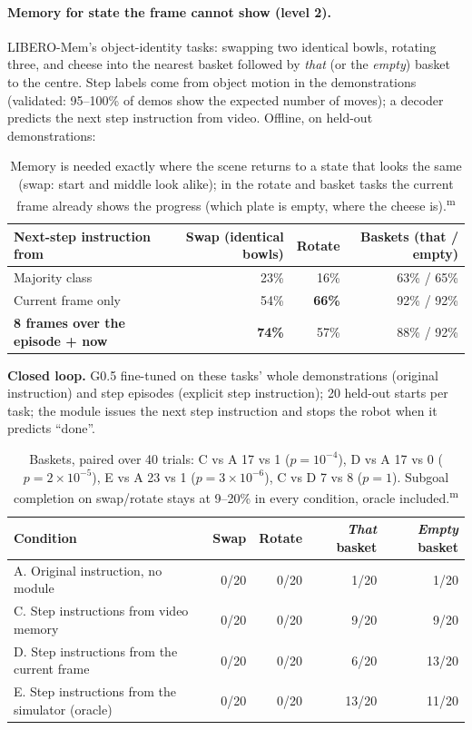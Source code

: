 \documentclass[10pt,a4paper]{article}
\DeclareRobustCommand{\meas}{\textsuperscript{\textcolor{green!50!black}{m}}}
\begin{document}
\paragraph{Memory for state the frame cannot show (level 2).} LIBERO-Mem's object-identity tasks: swapping two identical bowls, rotating three, and cheese into the nearest basket followed by \emph{that} (or the \emph{empty}) basket to the centre. Step labels come from object motion in the demonstrations (validated: 95--100\% of demos show the expected number of moves); a decoder predicts the next step instruction from video. Offline, on held-out demonstrations:
\begin{table}[H]\centering\small
\begin{tabular}{lrrr}
\toprule
Next-step instruction from & Swap (identical bowls) & Rotate & Baskets (that / empty) \\
\midrule
Majority class & 23\% & 16\% & 63\% / 65\% \\
Current frame only & 54\% & \textbf{66\%} & 92\% / 92\% \\
\textbf{8 frames over the episode + now} & \textbf{74\%} & 57\% & 88\% / 92\% \\
\bottomrule
\end{tabular}
\caption{Memory is needed exactly where the scene returns to a state that looks the same (swap: start and middle look alike); in the rotate and basket tasks the current frame already shows the progress (which plate is empty, where the cheese is).\meas}
\end{table}
\noindent\textbf{Closed loop.} G0.5 fine-tuned on these tasks' whole demonstrations (original instruction) and step episodes (explicit step instruction); 20 held-out starts per task; the module issues the next step instruction and stops the robot when it predicts ``done''.
\begin{table}[H]\centering\small
\begin{tabular}{lrrrr}
\toprule
Condition & Swap & Rotate & \emph{That} basket & \emph{Empty} basket \\
\midrule
A. Original instruction, no module & 0/20 & 0/20 & 1/20 & 1/20 \\
C. Step instructions from video memory & 0/20 & 0/20 & 9/20 & 9/20 \\
D. Step instructions from the current frame & 0/20 & 0/20 & 6/20 & 13/20 \\
E. Step instructions from the simulator (oracle) & 0/20 & 0/20 & 13/20 & 11/20 \\
\bottomrule
\end{tabular}
\caption{Baskets, paired over 40 trials: C vs A 17 vs 1 ($p=10^{-4}$), D vs A 17 vs 0 ($p=2\times10^{-5}$), E vs A 23 vs 1 ($p=3\times10^{-6}$), C vs D 7 vs 8 ($p=1$). Subgoal completion on swap/rotate stays at 9--20\% in every condition, oracle included.\meas}
\end{table}
\end{document}
